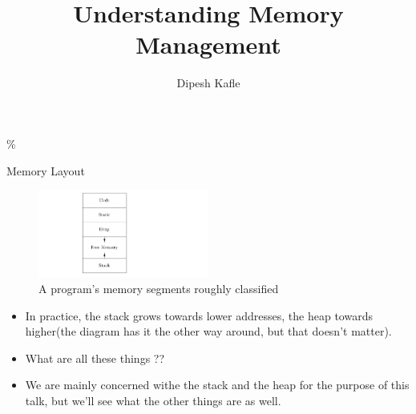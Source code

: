 \documentclass[
  10pt,
  ignorenonframetext,
]{beamer}
\title{Understanding Memory Management}
\author{Dipesh Kafle}
\date{}
\providecommand{\tightlist}{%
  \setlength{\itemsep}{0pt}\setlength{\parskip}{0pt}}
\begin{document}
\frame{\titlepage}

\begin{frame}
\setsansfont[ItalicFont={Fira Sans Light Italic},%
BoldFont={Fira Sans SemiBold},%
BoldItalicFont={Fira Sans Italic}]%
{Fira Sans Light}\%
\end{frame}

\begin{frame}{Memory Layout}
\protect\hypertarget{memory-layout}{}
\begin{figure}
\centering
\includegraphics[width=0.5\textwidth,height=\textheight]{memory.png}
\caption{A program's memory segments roughly
classified}
\end{figure}

\begin{itemize}
\tightlist
\item
  In practice, the stack grows towards lower
  addresses, the heap towards higher(the diagram
  has it the other way around, but that doesn't
  matter).
\end{itemize}

\pause

\begin{itemize}
\tightlist
\item
  What are all these things ??
\end{itemize}

\pause

\begin{itemize}
\tightlist
\item
  We are mainly concerned withe the stack and the
  heap for the purpose of this talk, but we'll see
  what the other things are as well.
\end{itemize}
\end{frame}
\end{document}
